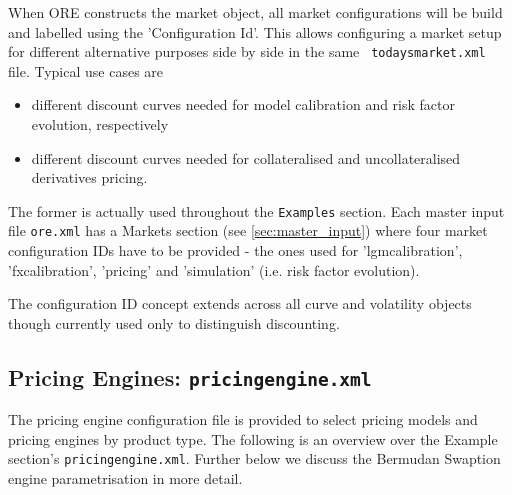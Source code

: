 \documentclass[12pt, a4paper]{article}
\begin{document}
{{When ORE constructs the market object, all market configurations will be build and labelled using the 'Configuration
Id'.  This allows configuring a market setup for different alternative purposes side by side in the same {\tt
  todaysmarket.xml} file. Typical use cases are
\begin{itemize}
\item different discount curves needed for model calibration and risk factor evolution, respectively
\item different discount curves needed for collateralised and uncollateralised derivatives pricing.
\end{itemize}
The former is actually used throughout the {\tt Examples} section. Each master input file {\tt ore.xml} has a Markets
section (see \ref{sec:master_input}) where four market configuration IDs have to be provided - the ones used for
'lgmcalibration', 'fxcalibration', 'pricing' and 'simulation' (i.e. risk factor evolution).

\medskip The configuration ID concept extends across all curve and volatility objects though currently used only to
distinguish discounting.
 
\subsection{Pricing Engines: {\tt pricingengine.xml}}

The pricing engine configuration file is provided to select pricing models and pricing engines by product type. The
following is an overview over the Example section's {\tt pricingengine.xml}. Further below we discuss the Bermudan Swaption engine parametrisation in more detail.

}}
\end{document}
